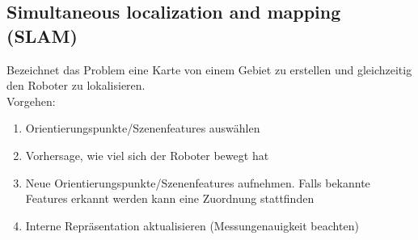 \subsection{Simultaneous localization and mapping (SLAM)}%
\label{bv:ssub:simultaneous-localization-and-mapping}
Bezeichnet das Problem eine Karte von einem Gebiet zu erstellen und gleichzeitig den Roboter zu lokalisieren.\\
Vorgehen:
\begin{enumerate}
\item Orientierungspunkte/Szenenfeatures auswählen
\item Vorhersage, wie viel sich der Roboter bewegt hat
\item Neue Orientierungspunkte/Szenenfeatures aufnehmen. Falls bekannte Features erkannt werden kann eine Zuordnung stattfinden
\item Interne Repräsentation aktualisieren (Messungenauigkeit beachten)
\end{enumerate}